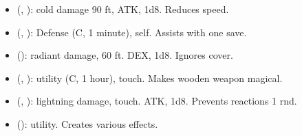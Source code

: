 \begin{itemize}
	\item {} (, ): cold damage 90 ft, ATK, 1d8. Reduces speed.
	\item {} (, ): Defense (C, 1 minute), self. Assists with one save.
	\item {} (): radiant damage, 60 ft. DEX, 1d8. Ignores cover.
	\item {} (, ): utility (C, 1 hour), touch. Makes wooden weapon magical.
	\item {} (, ): lightning damage, touch. ATK, 1d8. Prevents reactions 1 rnd.
	\item {} (): utility. Creates various effects.
\end{itemize}

